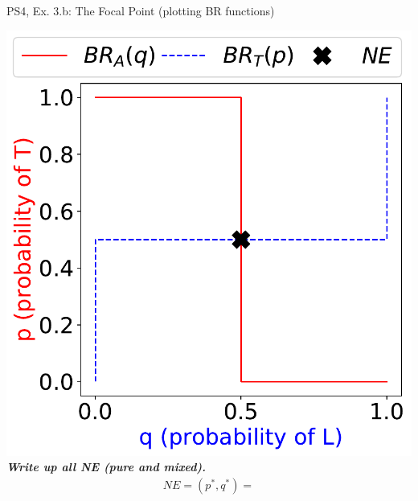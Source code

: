 \begin{frame}{PS4, Ex. 3.b: The Focal Point (plotting BR functions)}
\begin{multicols}{2}
    \vfill\null \columnbreak
    \includegraphics[width=\columnwidth]{figures/3b}
    \textbf{\textit{Write up all NE (pure and mixed).}}
    \begin{align*}
      NE=(p^{*},q^{*})=
    \end{align*}
  \vfill\null
  \end{multicols}
\end{frame}
